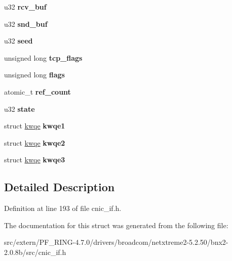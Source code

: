 \begin{DoxyCompactItemize}
\item 
\hypertarget{structcnic__sock_afedeb591eb0133700be47ad20f07c54c}{
u32 {\bfseries rcv\_\-buf}}
\label{structcnic__sock_afedeb591eb0133700be47ad20f07c54c}

\item 
\hypertarget{structcnic__sock_aa0129202e9a9de6cf4db4b6b09daf668}{
u32 {\bfseries snd\_\-buf}}
\label{structcnic__sock_aa0129202e9a9de6cf4db4b6b09daf668}

\item 
\hypertarget{structcnic__sock_ab3cb3fcc66a9e6fa752a0d95b18b0af8}{
u32 {\bfseries seed}}
\label{structcnic__sock_ab3cb3fcc66a9e6fa752a0d95b18b0af8}

\item 
\hypertarget{structcnic__sock_aea1682231b79e031090585e995119774}{
unsigned long {\bfseries tcp\_\-flags}}
\label{structcnic__sock_aea1682231b79e031090585e995119774}

\item 
\hypertarget{structcnic__sock_ae8fc05907390fa6d75a0c17e8a0f77e3}{
unsigned long {\bfseries flags}}
\label{structcnic__sock_ae8fc05907390fa6d75a0c17e8a0f77e3}

\item 
\hypertarget{structcnic__sock_a90a310f62212bf48befef293c222271f}{
atomic\_\-t {\bfseries ref\_\-count}}
\label{structcnic__sock_a90a310f62212bf48befef293c222271f}

\item 
\hypertarget{structcnic__sock_ab63f065fce58f5fd9d682ff6a024834f}{
u32 {\bfseries state}}
\label{structcnic__sock_ab63f065fce58f5fd9d682ff6a024834f}

\item 
\hypertarget{structcnic__sock_ae7b5a201896e2261dc2bd0e570efea21}{
struct \hyperlink{structkwqe}{kwqe} {\bfseries kwqe1}}
\label{structcnic__sock_ae7b5a201896e2261dc2bd0e570efea21}

\item 
\hypertarget{structcnic__sock_a9504722f3c3a7a490875f2b8f4710f75}{
struct \hyperlink{structkwqe}{kwqe} {\bfseries kwqe2}}
\label{structcnic__sock_a9504722f3c3a7a490875f2b8f4710f75}

\item 
\hypertarget{structcnic__sock_aff625e8fd9a27b10d94063a09f335369}{
struct \hyperlink{structkwqe}{kwqe} {\bfseries kwqe3}}
\label{structcnic__sock_aff625e8fd9a27b10d94063a09f335369}

\end{DoxyCompactItemize}


\subsection{Detailed Description}


Definition at line 193 of file cnic\_\-if.h.



The documentation for this struct was generated from the following file:\begin{DoxyCompactItemize}
\item 
src/extern/PF\_\-RING-\/4.7.0/drivers/broadcom/netxtreme2-\/5.2.50/bnx2-\/2.0.8b/src/cnic\_\-if.h\end{DoxyCompactItemize}
